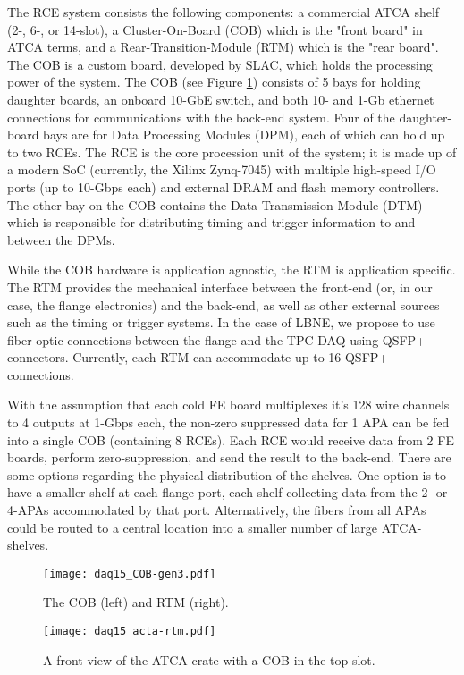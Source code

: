The RCE system consists the following components: a commercial ATCA
shelf (2-, 6-, or 14-slot), a Cluster-On-Board (COB) which is the
"front board" in ATCA terms, and a Rear-Transition-Module (RTM) which
is the "rear board".  The COB is a custom board, developed by SLAC,
which holds the processing power of the system.  The COB (see Figure
\ref{fig:daq15_cob}) consists of 5 bays for holding daughter boards, an onboard
10-GbE switch, and both 10- and 1-Gb ethernet connections for
communications with the back-end system.  Four of the daughter-board
bays are for Data Processing Modules (DPM), each of which can hold up
to two RCEs.  The RCE is the core procession unit of the system; it is
made up of a modern SoC (currently, the Xilinx Zynq-7045) with
multiple high-speed I/O ports (up to 10-Gbps each) and external DRAM
and flash memory controllers.  The other bay on the COB contains the
Data Transmission Module (DTM) which is responsible for distributing
timing and trigger information to and between the DPMs.

While the COB hardware is application agnostic, the RTM is application
specific. The RTM provides the mechanical interface between the
front-end (or, in our case, the flange electronics) and the back-end,
as well as other external sources such as the timing or trigger
systems.  In the case of LBNE, we propose to use fiber optic
connections between the flange and the TPC DAQ using QSFP+ connectors.
Currently, each RTM can accommodate up to 16 QSFP+ connections.

With the assumption that each cold FE board multiplexes it's 128 wire
channels to 4 outputs at 1-Gbps each, the non-zero suppressed data for
1 APA can be fed into a single COB (containing 8 RCEs).  Each RCE
would receive data from 2 FE boards, perform zero-suppression, and
send the result to the back-end.  There are some options regarding the
physical distribution of the shelves.  One option is to have a smaller
shelf at each flange port, each shelf collecting data from the 2- or
4-APAs accommodated by that port.  Alternatively, the fibers from all
APAs could be routed to a central location into a smaller number of
large ATCA-shelves.

\begin{figure}[hbt]
  \texttt{[image: daq15\_COB-gen3.pdf]}
  \caption{\label{fig:daq15_cob} The COB (left) and RTM (right).  }
\end{figure}
\begin{figure}[hbt]
  \texttt{[image: daq15\_acta-rtm.pdf]}
    \caption{A front view of the ATCA crate with a COB in the top slot. }
\end{figure}

